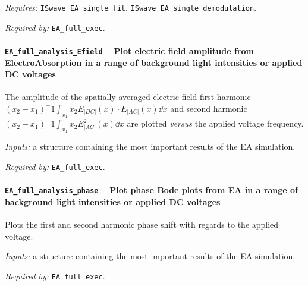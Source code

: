 		\textit{Requires:} \texttt{IS\-wave\_EA\_single\_fit}, \texttt{IS\-wave\_EA\_single\_demodulation}.

		\textit{Required by:} \texttt{EA\_full\_exec}.



		\paragraph{\texttt{EA\_full\_analysis\_Efield} -- Plot electric field amplitude from ElectroAbsorption in a range of background light intensities or applied DC voltages}
		The amplitude of the spatially averaged electric field first harmonic $(x_2-x_1)^-1 \int_{x_1}{x_2}E_|DC|(x) \cdot E_|AC|(x) \dd x$ and second harmonic $(x_2-x_1)^-1 \int_{x_1}{x_2} E_|AC|^2(x) \dd x$ are plotted \textsl{versus} the applied voltage frequency.

		\textit{Inputs:} a structure containing the most important results of the EA simulation.



		\textit{Required by:} \texttt{EA\_full\_exec}.


		\paragraph{\texttt{EA\_full\_analysis\_phase} -- Plot phase Bode plots from EA in a range of background light intensities or applied DC voltages}
		Plots the first and second harmonic phase shift with regards to the applied voltage.

		\textit{Inputs:} a structure containing the most important results of the EA simulation.



		\textit{Required by:} \texttt{EA\_full\_exec}.






